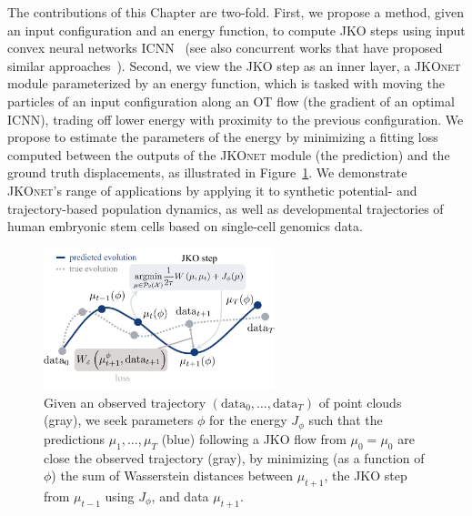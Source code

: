 The contributions of this Chapter are two-fold. First, we propose a method, given an input configuration and an energy function, to compute \acrshort{JKO} steps using input convex neural networks \acrlong{ICNN}~\citep{amos2017input,makkuva2020optimal} (see also concurrent works that have proposed similar approaches~\citep{alvarez2021optimizing, mokrov2021large}). Second, we view the \acrshort{JKO} step as an inner layer, a \textsc{JKOnet} module parameterized by an energy function, which is tasked with moving the particles of an input configuration along an OT flow (the gradient of an optimal ICNN), trading off lower energy with proximity to the previous configuration.
We propose to estimate the parameters of the energy by minimizing a fitting loss %
computed between the outputs of the \textsc{JKOnet} module (the prediction) and the ground truth displacements, as illustrated in Figure~\ref{fig:overview_jkonet}.
We demonstrate \textsc{JKOnet}'s range of applications by applying it to synthetic potential- and trajectory-based population dynamics, as well as developmental trajectories of human embryonic stem cells based on single-cell genomics data.

\begin{figure}[t]
    \centering
    \includegraphics[width=0.6\textwidth]{figures/fig_overview_jkonet.pdf}
    \caption{Given an observed trajectory $(\mathrm{data}_0,\dots,\mathrm{data}_T)$ of point clouds (gray), we seek parameters $\phi$ for the energy $J_\phi$ such that the predictions $\mu_1, \dots, \mu_T$ (blue) following a \acrshort{JKO} flow from $\mu_0=\mu_0$ are close the observed trajectory (gray), by minimizing (as a function of $\phi$) the sum of Wasserstein distances between $\mu_{t+1}$, the \acrshort{JKO} step from $\mu_{t-1}$ using $J_\phi$, and data $\mu_{t+1}$.}
    \label{fig:overview_jkonet}
\end{figure}


